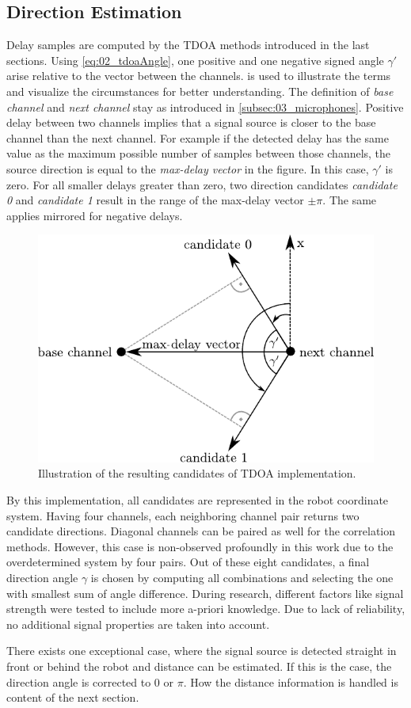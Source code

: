 \subsection{Direction Estimation}
\label{subsec:03_directionCandidates}

Delay samples are computed by the \ac{TDOA} methods introduced in the last
sections.
Using \cref{eq:02_tdoaAngle}, one positive and one negative signed angle $\gamma'$
arise relative to the vector between the channels.
 is used to illustrate the terms and visualize the
circumstances for better understanding.
The definition of \textit{base channel} and \textit{next channel} stay as introduced
in \cref{subsec:03_microphones}.
Positive delay between two channels implies that a signal source
is closer to the base channel than the next channel.
For example if the detected delay has the same value as the maximum possible number
of samples between those channels, the source direction is equal to the
\textit{max-delay vector} in the figure.
In this case, $\gamma'$ is zero.
For all smaller delays greater than zero, two direction candidates \textit{candidate 0}
and \textit{candidate 1} result in the range of the max-delay vector $\pm \pi$.
The same applies mirrored for negative delays.

\begin{figure}[ht]
	\centering
		\includegraphics[width=0.6\columnwidth]{figures/tdoa_code}
	\caption{Illustration of the resulting candidates of \ac{TDOA} implementation.}
	\label{fig:03_tdoaCode}
\end{figure}


By this implementation, all candidates are represented in the robot coordinate system.
Having four channels, each neighboring channel pair returns two candidate directions.
Diagonal channels can be paired as well for the correlation methods.
However, this case is non-observed profoundly in this work due to the overdetermined
system by four pairs.
Out of these eight candidates, a final direction angle $\gamma$ is chosen
by computing all combinations and selecting the one with smallest sum of angle difference.
During research, different factors like signal strength were tested to include
more a-priori knowledge.
Due to lack of reliability, no additional signal properties are taken into account.

There exists one exceptional case, where the signal source is detected straight in front
or behind the robot and distance can be estimated.
If this is the case, the direction angle is corrected to 0 or $\pi$.
How the distance information is handled is content of the next section.
